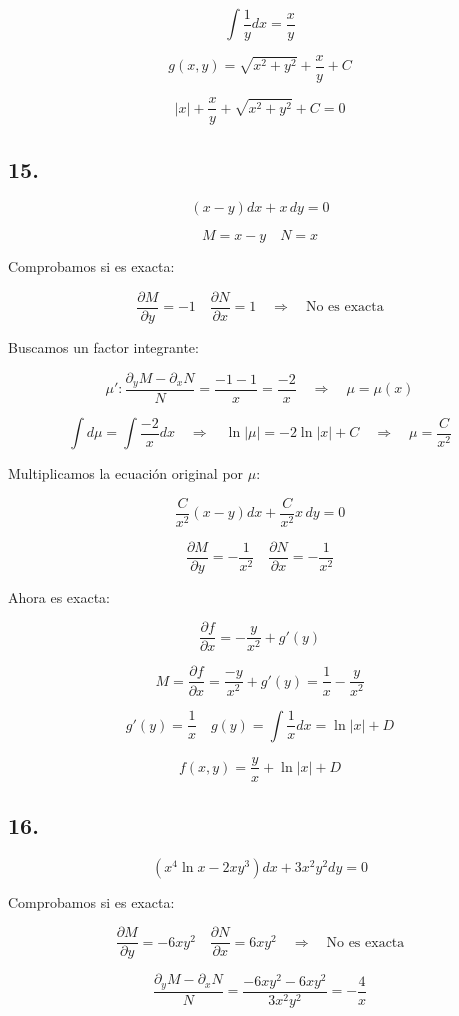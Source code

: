 \documentclass[a4paper,12pt]{article}
\begin{document}
\[
\int \frac{1}{y} dx = \frac{x}{y}
\]

\[
g(x,y) = \sqrt{x^2 + y^2} + \frac{x}{y} + C
\]

\[
|x| + \frac{x}{y} + \sqrt{x^2 + y^2} + C = 0
\]
\subsection*{15.}
\[
(x - y)dx + x\, dy = 0
\]

\[
M = x - y \quad N = x
\]

Comprobamos si es exacta:

\[
\frac{\partial M}{\partial y} = -1 \quad \frac{\partial N}{\partial x} = 1 \quad \Rightarrow \quad \text{No es exacta}
\]

Buscamos un factor integrante:

\[
\mu': \frac{\partial_y M - \partial_x N}{N} = \frac{-1 - 1}{x} = \frac{-2}{x} \quad \Rightarrow \quad \mu = \mu(x)
\]

\[
\int d\mu = \int \frac{-2}{x} dx \quad \Rightarrow \quad \ln|\mu| = -2 \ln|x| + C \quad \Rightarrow \quad \mu = \frac{C}{x^2}
\]

Multiplicamos la ecuación original por $\mu$:

\[
\frac{C}{x^2}(x - y) dx + \frac{C}{x^2} x\, dy = 0
\]

\[
\frac{\partial M}{\partial y} = -\frac{1}{x^2} \quad \frac{\partial N}{\partial x} = -\frac{1}{x^2}
\]

Ahora es exacta:

\[
\frac{\partial f}{\partial x} = -\frac{y}{x^2} + g'(y)
\]

\[
M = \frac{\partial f}{\partial x} = \frac{-y}{x^2} + g'(y) = \frac{1}{x} - \frac{y}{x^2}
\]

\[
g'(y) = \frac{1}{x} \quad g(y) = \int \frac{1}{x} dx = \ln|x| + D
\]

\[
f(x,y) = \frac{y}{x} + \ln|x| + D
\]


\subsection*{16.}
\[
(x^4 \ln x - 2x y^3) dx + 3x^2 y^2 dy = 0
\]

Comprobamos si es exacta:

\[
\frac{\partial M}{\partial y} = -6xy^2 \quad \frac{\partial N}{\partial x} = 6xy^2 \quad \Rightarrow \quad \text{No es exacta}
\]

\[
\frac{\partial_y M - \partial_x N}{N} = \frac{-6xy^2 - 6xy^2}{3x^2 y^2} = -\frac{4}{x}
\]
\end{document}
